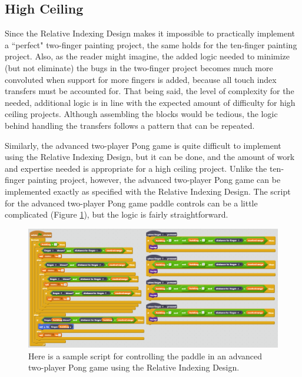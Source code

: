 \subsection{High Ceiling}

Since the Relative Indexing Design makes it impossible to practically implement a ``perfect" two-finger painting project, the same holds for the ten-finger painting project. Also, as the reader might imagine, the added logic needed to minimize (but not eliminate) the bugs in the two-finger project becomes much more convoluted when support for more fingers is added, because all touch index transfers must be accounted for. That being said, the level of complexity for the needed, additional logic is in line with the expected amount of difficulty for high ceiling projects. Although assembling the blocks would be tedious, the logic behind handling the transfers follows a pattern that can be repeated.

Similarly, the advanced two-player Pong game is quite difficult to implement using the Relative Indexing Design, but it can be done, and the amount of work and expertise needed is appropriate for a high ceiling project. Unlike the ten-finger painting project, however, the advanced two-player Pong game can be implemented exactly as specified with the Relative Indexing Design. The script for the advanced two-player Pong game paddle controls can be a little complicated (Figure \ref{AdvancedTwoPlayerPongRID}), but the logic is fairly straightforward. 

\begin{figure}
\centering
\includegraphics[width=1.0\textwidth]{images/AdvancedTwoPlayerPongRID.PNG}
\caption[Sample Relative Indexing Design Script for Advanced Two-Player Pong]{Here is a sample script for controlling the paddle in an advanced two-player Pong game using the Relative Indexing Design.}
\label{AdvancedTwoPlayerPongRID}
\end{figure}

